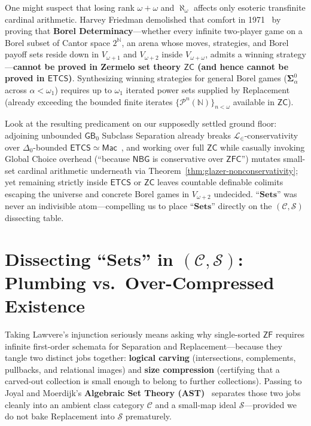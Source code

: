 One might suspect that losing rank $\omega + \omega$ and $\aleph_\omega$ affects only esoteric transfinite cardinal arithmetic. Harvey Friedman demolished that comfort in 1971~\cite{Friedman71} by proving that \textbf{Borel Determinacy}---whether every infinite two-player game on a Borel subset of Cantor space $2^{\mathbb{N}}$, an arena whose moves, strategies, and Borel payoff sets reside down in $V_{\omega+1}$ and $V_{\omega+2}$ inside $V_{\omega+\omega}$, admits a winning strategy---\textbf{cannot be proved in Zermelo set theory $\mathsf{ZC}$ (and hence cannot be proved in $\mathsf{ETCS}$)}. Synthesizing winning strategies for general Borel games ($\boldsymbol{\Sigma}^0_\alpha$ across $\alpha < \omega_1$) requires up to $\omega_1$ iterated power sets supplied by Replacement (already exceeding the bounded finite iterates $\{\mathcal{P}^n(\mathbb{N})\}_{n < \omega}$ available in $\mathsf{ZC}$).

Look at the resulting predicament on our supposedly settled ground floor: adjoining unbounded $\mathsf{GB}_0$ Subclass Separation already breaks $\mathcal{L}_\in$-conservativity over $\Delta_0$-bounded $\mathsf{ETCS} \simeq \mathsf{Mac}$~\cite{Mathias01}, and working over full $\mathsf{ZC}$ while casually invoking Global Choice overhead (``because $\mathsf{NBG}$ is conservative over $\mathsf{ZFC}$'') mutates small-set cardinal arithmetic underneath via Theorem~\ref{thm:glazer-nonconservativity}; yet remaining strictly inside $\mathsf{ETCS}$ or $\mathsf{ZC}$ leaves countable definable colimits escaping the universe and concrete Borel games in $V_{\omega+2}$ undecided. ``$\mathbf{Sets}$'' was never an indivisible atom---compelling us to place ``$\mathbf{Sets}$'' directly on the $(\mathcal{C}, \mathcal{S})$ dissecting table.

\section{\texorpdfstring{Dissecting ``$\mathbf{Sets}$'' in $(\mathcal{C}, \mathcal{S})$: Plumbing vs.\ Over-Compressed Existence}{Dissecting "Sets" in (C, S): Plumbing vs. Over-Compressed Existence}}\label{sec:ast-plumbing-compression}

Taking Lawvere's injunction seriously means asking why single-sorted $\mathsf{ZF}$ requires infinite first-order schemata for Separation and Replacement---because they tangle two distinct jobs together: \textbf{logical carving} (intersections, complements, pullbacks, and relational images) and \textbf{size compression} (certifying that a carved-out collection is small enough to belong to further collections). Passing to Joyal and Moerdijk's \textbf{Algebraic Set Theory (AST)}~\cite{JoyalMoerdijk95} separates those two jobs cleanly into an ambient class category $\mathcal{C}$ and a small-map ideal $\mathcal{S}$---provided we do not bake Replacement into $\mathcal{S}$ prematurely.

